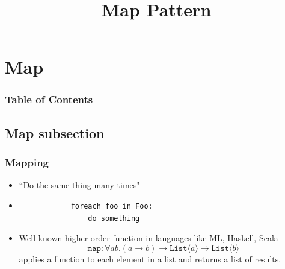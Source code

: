 \documentclass[xcolor=dvipsnames]{beamer}
\begin{document}
	\title[Map Pattern]{Map Pattern}
	\author[]{\className}
	\institute[\className]{\departmentName}
	\date{} 


	\begin{frame}
		\maketitle
	\end{frame}


\section{Map} 

	\begin{frame} \frametitle{Table of Contents}
		\tableofcontents[currentsection]
	\end{frame} 
	
	
	\subsection{Map subsection}
	
		\begin{frame}[fragile] \frametitle{Mapping}
		\begin{itemize}
			\item ``Do the same thing many times"
			\item \begin{verbatim}
			foreach foo in Foo:
			    do something
			\end{verbatim}
			\item Well known higher order function in languages like ML, Haskell, Scala
			\[ \texttt{map} : \forall a b. (a \to b) \to \texttt{List}\langle a\rangle \to \texttt{List}\langle b\rangle \]
			applies a function to each element in a list and returns a list of results.\\
		\end{itemize}
		\end{frame}
		
\end{document}
